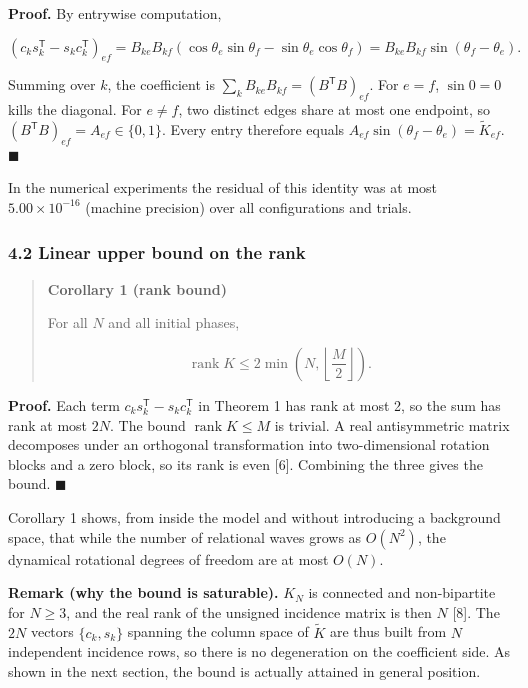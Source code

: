 \documentclass[
  a4paper,
]{article}
\begin{document}
\textbf{Proof.} By entrywise computation,

\[
\left(c_k s_k^{\mathsf T}-s_k c_k^{\mathsf T}\right)_{ef}
=
B_{ke}B_{kf}\left(\cos\theta_e\sin\theta_f-\sin\theta_e\cos\theta_f\right)
=
B_{ke}B_{kf}\sin(\theta_f-\theta_e).
\]

Summing over \(k\), the coefficient is
\(\sum_kB_{ke}B_{kf}=(B^{\mathsf T}B)_{ef}\). For \(e=f\), \(\sin0=0\)
kills the diagonal. For \(e\ne f\), two distinct edges share at most one
endpoint, so \((B^{\mathsf T}B)_{ef}=A_{ef}\in\{0,1\}\). Every entry
therefore equals \(A_{ef}\sin(\theta_f-\theta_e)=\widetilde K_{ef}\).
\(\blacksquare\)

In the numerical experiments the residual of this identity was at most
\(5.00\times10^{-16}\) (machine precision) over all configurations and
trials.

\subsubsection{4.2 Linear upper bound on the
rank}\label{linear-upper-bound-on-the-rank}

\begin{quote}
\textbf{Corollary 1 (rank bound)}

For all \(N\) and all initial phases,

\[
\operatorname{rank}K
\le
2\min\!\left(N,\left\lfloor\frac{M}{2}\right\rfloor\right).
\]
\end{quote}

\textbf{Proof.} Each term \(c_ks_k^{\mathsf T}-s_kc_k^{\mathsf T}\) in
Theorem 1 has rank at most 2, so the sum has rank at most \(2N\). The
bound \(\operatorname{rank}K\le M\) is trivial. A real antisymmetric
matrix decomposes under an orthogonal transformation into
two-dimensional rotation blocks and a zero block, so its rank is even
{[}6{]}. Combining the three gives the bound. \(\blacksquare\)

Corollary 1 shows, from inside the model and without introducing a
background space, that while the number of relational waves grows as
\(O(N^2)\), the dynamical rotational degrees of freedom are at most
\(O(N)\).

\textbf{Remark (why the bound is saturable).} \(K_N\) is connected and
non-bipartite for \(N\ge3\), and the real rank of the unsigned incidence
matrix is then \(N\) {[}8{]}. The \(2N\) vectors \(\{c_k,s_k\}\)
spanning the column space of \(\widetilde K\) are thus built from \(N\)
independent incidence rows, so there is no degeneration on the
coefficient side. As shown in the next section, the bound is actually
attained in general position.
\end{document}

